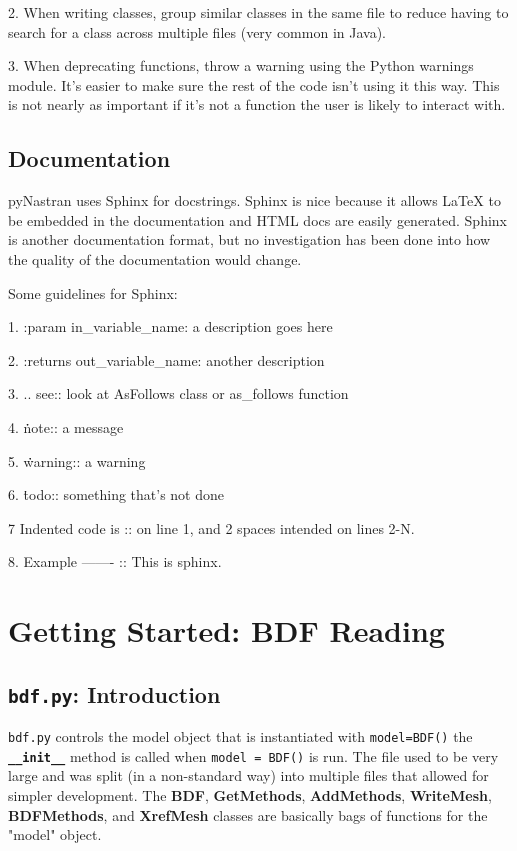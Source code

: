      2.  When writing classes, group similar classes in the same file to reduce having to search for a class across multiple files (very common in Java).

     3.  When deprecating functions, throw a warning using the Python warnings module.  It's easier to make sure the rest of the code isn't using it this way.  This is not nearly as important if it's not a function the user is likely to interact with.

 \subsection{Documentation}
     pyNastran uses Sphinx for docstrings.  Sphinx is nice because it allows LaTeX to be embedded in the documentation and HTML docs are easily generated.  Sphinx is another documentation format, but no investigation has been done into how the quality of the documentation would change.

    Some guidelines for Sphinx:

     1.  :param  in\_variable\_name: a description goes here

     2.  :returns out\_variable\_name: another description

     3.  .. see::    look at AsFollows class or as\_follows function

     4.  \.\. note::   a message

     5.  \.\. warning:: a warning

     6.  \.\. todo::   something that's not done

     7   Indented code is :: on line 1, and 2 spaces intended on lines 2-N.

     8.  Example
         -------
         ::
           This is sphinx.



\section{Getting Started: BDF Reading}
 \subsection{{\tt bdf.py}:  Introduction}
     {\tt bdf.py} controls the model object that is instantiated with      {\tt model=BDF()} the {\bf \tt \_\_init\_\_} method is called when {\tt model = BDF()} is run.  The file used to be very large and was split (in a non-standard way) into multiple files that allowed for simpler development.  The {\bf BDF}, {\bf GetMethods}, {\bf AddMethods}, {\bf WriteMesh}, {\bf BDFMethods}, and {\bf XrefMesh} classes are basically bags of functions for the "model" object.

